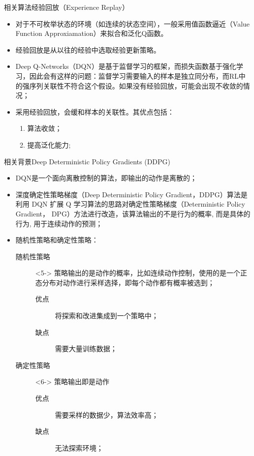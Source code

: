 \documentclass[10pt]{beamer}
\begin{document}
	\begin{frame}{相关算法}{经验回放（Experience Replay）}
		\begin{itemize}
			\item<2-> 对于不可枚举状态的环境（如连续的状态空间），一般采用值函数逼近（Value Function Approxiamation）来拟合和泛化Q函数。
			
			\item<3-> 经验回放是从以往的经验中选取经验更新策略。
			
			\item<4-> Deep Q-Networks（DQN）\cite{Hasselt16:DQN}是基于监督学习的框架，而损失函数基于强化学习，因此会有这样的问题：监督学习需要输入的样本是独立同分布，而RL中的强序列关联性不符合这个假设。如果没有经验回放，可能会出现不收敛的情况；
			
			\item<5-> 采用经验回放，会缓和样本的关联性。其优点包括：
				\begin{enumerate}
					\item 算法收敛；
					\item 提高泛化能力;
				\end{enumerate}
		\end{itemize}
	\end{frame}

	\begin{frame}{相关背景}{Deep Deterministic Policy Gradients (DDPG)}
		\begin{itemize}
			\item<2-> DQN是一个面向离散控制的算法，即输出的动作是离散的；
			
			\item<3-> 深度确定性策略梯度（Deep Deterministic Policy Gradient，DDPG）算法\cite{Chou17:DDPG}是利用 DQN 扩展 Q 学习算法的思路对确定性策略梯度（Deterministic Policy Gradient， DPG）方法进行改造，该算法输出的不是行为的概率, 而是具体的行为, 用于连续动作的预测；
			
			\item<4-> 随机性策略和确定性策略：
				\begin{description}
					\item[随机性策略]<5-> 策略输出的是动作的概率，比如连续动作控制，使用的是一个正态分布对动作进行采样选择，即每个动作都有概率被选到；
						\begin{description}
							\item[优点] 将探索和改进集成到一个策略中；
							\item[缺点] 需要大量训练数据；
						\end{description}
					
					\item [确定性策略]<6-> 策略输出即是动作
						\begin{description}
							\item[优点] 需要采样的数据少，算法效率高；
							\item[缺点] 无法探索环境；
						\end{description}
				\end{description}
			
		\end{itemize}
	\end{frame}
	
\end{document}
